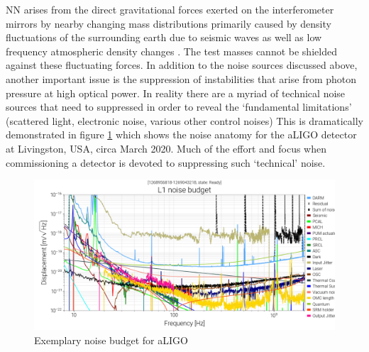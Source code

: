 \Ac*{NN} arises from the direct gravitational forces exerted on the interferometer mirrors by nearby changing mass distributions primarily caused by density fluctuations of the surrounding earth due to seismic waves as well as low frequency atmospheric density changes \cite{InfrasoundNewtonianNoise2018}. 
The test masses cannot be shielded against these fluctuating forces.  In addition to the noise sources discussed above, another important issue is the suppression of instabilities that arise from photon pressure at high optical power. In reality there are a myriad of technical noise sources that need to suppressed in order to reveal the ‘fundamental limitations' (scattered light, electronic noise, various other control noises)  This is dramatically demonstrated in  figure \ref{fig:aLIGO_Noises} which shows the noise anatomy for the \acf{aLIGO} detector at Livingston, \ac{USA},  circa March 2020.  Much  of the effort and focus when commissioning  a detector is devoted to suppressing such ‘technical’  noise.
\begin{figure}
\includegraphics[width=\textwidth]{Figures/L1-READY_7A4FE0_NOISE_BUDGET-1268956818-86400.png}
\caption{Exemplary noise budget for \acf{aLIGO}}
\label{fig:aLIGO_Noises}
\end{figure}
